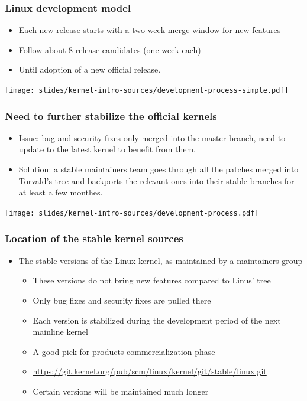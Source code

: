 \begin{frame}
  \frametitle{Linux development model}
  \begin{itemize}
  \item Each new release starts with a two-week merge window for new
    features
  \item Follow about 8 release candidates (one week each)
  \item Until adoption of a new official release.
  \end{itemize}
  \begin{center}
    \texttt{[image: slides/kernel-intro-sources/development-process-simple.pdf]}
  \end{center}
\end{frame}

\begin{frame}[fragile]
  \frametitle{Need to further stabilize the official kernels}
  \begin{itemize}
  \item Issue: bug and security fixes only merged into the master
    branch, need to update to the latest kernel to benefit from them.
  \item Solution: a stable maintainers team goes through all the patches
    merged into Torvald's tree and backports the relevant ones into
    their stable branches for at least a few monthes.
  \end{itemize}
  \begin{center}
    \texttt{[image: slides/kernel-intro-sources/development-process.pdf]}
  \end{center}
\end{frame}

\begin{frame}
  \frametitle{Location of the stable kernel sources}
  \begin{itemize}
    \item The stable versions of the Linux kernel, as maintained by a
      maintainers group
    \begin{itemize}
    \item These versions do not bring new features compared to Linus'
      tree
    \item Only bug fixes and security fixes are pulled there
    \item Each version is stabilized during the development period of
      the next mainline kernel
    \item A good pick for products commercialization phase
    \item \url{https://git.kernel.org/pub/scm/linux/kernel/git/stable/linux.git}
    \item Certain versions will be maintained much longer
    \end{itemize}
  \end{itemize}
\end{frame}

